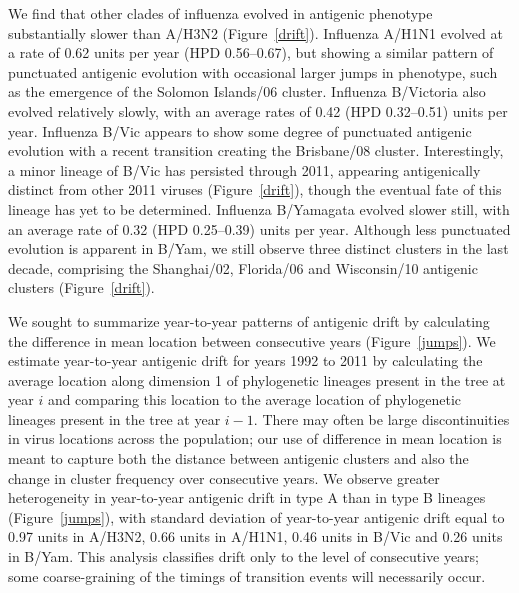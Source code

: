 \documentclass[11pt,oneside,letterpaper]{article}
\begin{document}
We find that other clades of influenza evolved in antigenic phenotype substantially slower than A/H3N2 (Figure~\ref{drift}).
Influenza A/H1N1 evolved at a rate of 0.62 units per year (HPD 0.56--0.67), but showing a similar pattern of punctuated antigenic evolution with occasional larger jumps in phenotype, such as the emergence of the Solomon Islands/06 cluster.  
Influenza B/Victoria also evolved relatively slowly, with an average rates of 0.42 (HPD 0.32--0.51) units per year.
Influenza B/Vic appears to show some degree of punctuated antigenic evolution with a recent transition creating the Brisbane/08 cluster.
Interestingly, a minor lineage of B/Vic has persisted through 2011, appearing antigenically distinct from other 2011 viruses (Figure~\ref{drift}), though the eventual fate of this lineage has yet to be determined.
Influenza B/Yamagata evolved slower still, with an average rate of 0.32 (HPD 0.25--0.39) units per year.
Although less punctuated evolution is apparent in B/Yam, we still observe three distinct clusters in the last decade, comprising the Shanghai/02, Florida/06 and Wisconsin/10 antigenic clusters (Figure~\ref{drift}).

We sought to summarize year-to-year patterns of antigenic drift by calculating the difference in mean location between consecutive years (Figure~\ref{jumps}).
We estimate year-to-year antigenic drift for years 1992 to 2011 by calculating the average location along dimension 1 of phylogenetic lineages present in the tree at year $i$ and comparing this location to the average location of phylogenetic lineages present in the tree at year $i-1$.
There may often be large discontinuities in virus locations across the population; our use of difference in mean location is meant to capture both the distance between antigenic clusters and also the change in cluster frequency over consecutive years.
We observe greater heterogeneity in year-to-year antigenic drift in type A than in type B lineages (Figure~\ref{jumps}), with standard deviation of year-to-year antigenic drift equal to 0.97 units in A/H3N2, 0.66 units in A/H1N1, 0.46 units in B/Vic and 0.26 units in B/Yam.
This analysis classifies drift only to the level of consecutive years; some coarse-graining of the timings of transition events will necessarily occur.
\end{document}

